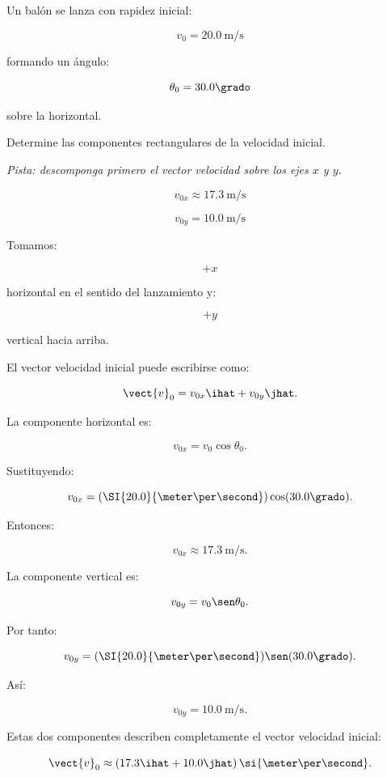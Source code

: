 ﻿\nivelbasico


\begin{ejercicio}
Un balón se lanza con rapidez inicial:

\[
v_0=\SI{20.0}{\meter\per\second}
\]

formando un ángulo:

\[
\theta_0=30.0\grado
\]

sobre la horizontal.

Determine las componentes rectangulares de la velocidad inicial.

\textit{Pista: descomponga primero el vector velocidad sobre los ejes \(x\) y \(y\).}
\end{ejercicio}

\begin{respuesta}
\[
\boxed{
v_{0x}\approx\SI{17.3}{\meter\per\second}
}
\]

\[
\boxed{
v_{0y}=\SI{10.0}{\meter\per\second}
}
\]
\end{respuesta}

\begin{explicacion}
Tomamos:

\[
+x
\]

horizontal en el sentido del lanzamiento y:

\[
+y
\]

vertical hacia arriba.

El vector velocidad inicial puede escribirse como:

\[
\vect{v}_0
=
v_{0x}\ihat+v_{0y}\jhat.
\]

La componente horizontal es:

\[
v_{0x}
=
v_0\cos\theta_0.
\]

Sustituyendo:

\[
v_{0x}
=
(\SI{20.0}{\meter\per\second})
\cos(30.0\grado).
\]

Entonces:

\[
\boxed{
v_{0x}\approx\SI{17.3}{\meter\per\second}
}.
\]

La componente vertical es:

\[
v_{0y}
=
v_0\sen\theta_0.
\]

Por tanto:

\[
v_{0y}
=
(\SI{20.0}{\meter\per\second})
\sen(30.0\grado).
\]

Así:

\[
\boxed{
v_{0y}=\SI{10.0}{\meter\per\second}
}.
\]

Estas dos componentes describen completamente el vector velocidad inicial:

\[
\vect{v}_0
\approx
(17.3\ihat+10.0\jhat)
\,\si{\meter\per\second}.
\]
\end{explicacion}


